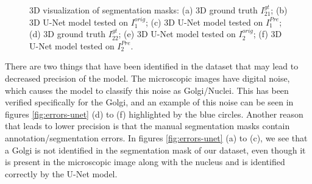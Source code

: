 \begin{figure}[!htb]
\hfil 
{}\hfil
{}
\caption{3D visualization of segmentation masks: (a) 3D ground truth $I^{gt}_{21}$; (b) 3D U-Net model tested on $I^{orig}_1$; (c) 3D U-Net model tested on $I^{Pre}_1$; (d) 3D ground truth $I^{gt}_{22}$; (e) 3D U-Net model tested on $I^{orig}_2$; (f) 3D U-Net model tested on $I^{Pre}_2$.}

\label{fig:results-unet}

\end{figure}

There are two things that have been identified in the dataset that may lead to decreased precision of the model. The microscopic images have digital noise, which causes the model to classify this noise as Golgi/Nuclei. This has been verified specifically for the Golgi, and an example of this noise can be seen in figures \ref{fig:errors-unet} (d) to (f) highlighted by the blue circles. Another reason that leads to lower precision is that the manual segmentation masks contain annotation/segmentation errors. In figures \ref{fig:errors-unet} (a) to (c), we see that a Golgi is not identified in the segmentation mask  of our dataset, even though it is present in the microscopic image along with the nucleus and is identified correctly by the U-Net model.

